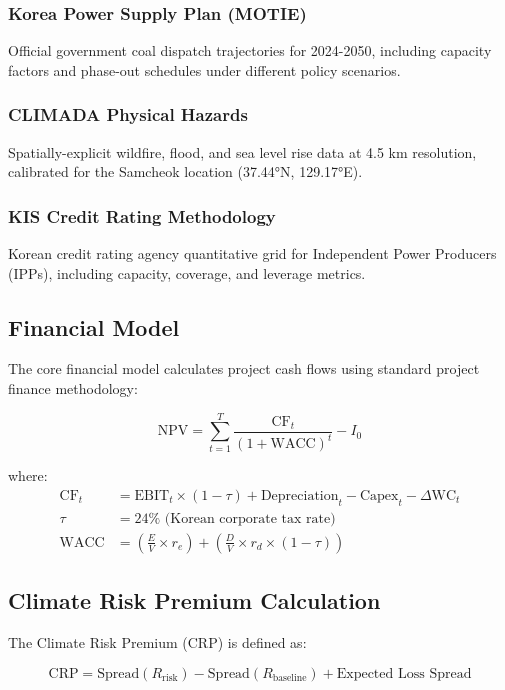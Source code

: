\documentclass[11pt,a4paper]{article}
\begin{document}
\subsubsection{Korea Power Supply Plan (MOTIE)}
Official government coal dispatch trajectories for 2024-2050, including capacity factors and phase-out schedules under different policy scenarios.

\subsubsection{CLIMADA Physical Hazards}
Spatially-explicit wildfire, flood, and sea level rise data at 4.5 km resolution, calibrated for the Samcheok location (37.44°N, 129.17°E).

\subsubsection{KIS Credit Rating Methodology}
Korean credit rating agency quantitative grid for Independent Power Producers (IPPs), including capacity, coverage, and leverage metrics.

\subsection{Financial Model}

The core financial model calculates project cash flows using standard project finance methodology:

\begin{equation}
\text{NPV} = \sum_{t=1}^{T} \frac{\text{CF}_t}{(1 + \text{WACC})^t} - I_0
\end{equation}

where:
\begin{align}
\text{CF}_t &= \text{EBIT}_t \times (1 - \tau) + \text{Depreciation}_t - \text{Capex}_t - \Delta\text{WC}_t \\
\tau &= 24\% \text{ (Korean corporate tax rate)} \\
\text{WACC} &= \left(\frac{E}{V} \times r_e\right) + \left(\frac{D}{V} \times r_d \times (1 - \tau)\right)
\end{align}

\subsection{Climate Risk Premium Calculation}

The Climate Risk Premium (CRP) is defined as:

\begin{equation}
\text{CRP} = \text{Spread}(R_{\text{risk}}) - \text{Spread}(R_{\text{baseline}}) + \text{Expected Loss Spread}
\end{equation}
\end{document}
